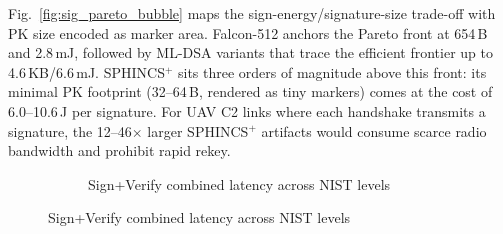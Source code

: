 Fig.~\ref{fig:sig_pareto_bubble} maps the sign-energy/signature-size
trade-off with PK size encoded as marker area.  Falcon-512 anchors
the Pareto front at 654\,B and 2.8\,mJ, followed by ML-DSA variants
that trace the efficient frontier up to 4.6\,KB/6.6\,mJ.  SPHINCS$^+$
sits three orders of magnitude above this front: its minimal PK
footprint (32--64\,B, rendered as tiny markers) comes at the cost of
6.0--10.6\,J per signature.  For UAV C2 links where each handshake
transmits a signature, the 12--46$\times$ larger SPHINCS$^+$ artifacts
would consume scarce radio bandwidth and prohibit rapid rekey.

\begin{figure}[t]
\centering
\begin{subfigure}[b]{\columnwidth}
\centering
{}
\caption{Sign+Verify combined latency across NIST levels}
\end{subfigure}


\end{figure}
